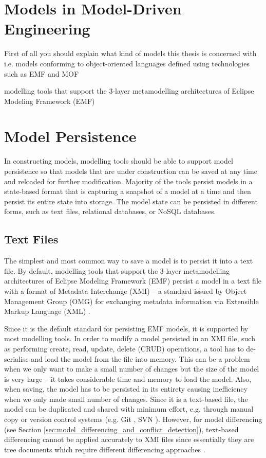 \section{Models in Model-Driven Engineering}
\label{sec:models_in_model_driven_engineering))}

First of all you should explain what kind of models this thesis is concerned with i.e. models conforming to object-oriented languages defined using technologies such as EMF and MOF

modelling tools that support the 3-layer metamodelling architectures of Eclipse Modeling Framework (EMF) \cite{steinberg2008emf}


\section{Model Persistence}
\label{sec:model_persistence}
In constructing models, modelling tools should be able to support model persistence so that models that are under construction can be saved at any time and reloaded for further modification. Majority of the tools persist models in a state-based format that is capturing a snapshot of a model at a time and then persist its entire state into storage. The model state can be persisted in different forms, such as text files, relational databases, or NoSQL databases.

\subsection{Text Files}
\label{sec:text_file}
The simplest and most common way to save a model is to persist it into a text file. By default, modelling tools that support the 3-layer metamodelling architectures of Eclipse Modeling Framework (EMF) \cite{steinberg2008emf} persist a model in a text file with a format of Metadata Interchange (XMI) -- a standard issued by Object Management Group (OMG) for exchanging metadata information via Extensible Markup Language (XML) \cite{omg2018xmi}. 

Since it is the default standard for persisting EMF models, it is supported by  most modelling tools. In order to modify a model persisted in an XMI file, such as performing create, read, update, delete (CRUD) operations, a tool has to de-serialise and load the model from the file into memory. This can be a problem when we only want to make a small number of changes but the size of the model is very large -- it takes considerable time and memory to load the model. Also, when saving, the model has to be persisted in its entirety causing inefficiency when we only made small number of changes. Since it is a text-based file, the model can be duplicated and shared with minimum effort, e.g. through manual copy or version control systems (e.g. Git \cite{git2019about}, SVN \cite{apache2019svn}). However, for model differencing (see Section \ref{sec:model_differencing_and_conflict_detection}), text-based differencing \cite{DBLP:journals/algorithmica/Meyers86} cannot be applied accurately to XMI files since essentially they are tree documents which require different differencing approaches \cite{wang2003xdiff}.

